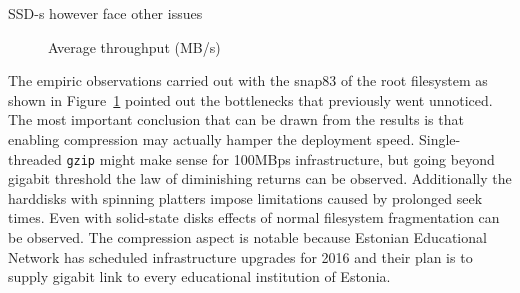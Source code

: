 \documentclass[a4paper,11pt]{kth-mag}
\begin{document}
SSD-s however face other issues

\begin{figure}
\caption{Average throughput (MB/s)}
\label{fig:average-throughput}
\end{figure}

The empiric observations carried out with
the snap83 of the root filesystem as shown in Figure~\ref{fig:average-throughput} pointed out
the bottlenecks that previously went unnoticed.
The most important conclusion that can be drawn from the
results is that enabling compression may actually hamper the
deployment speed.
Single-threaded \lstinline!gzip! might make sense for 100MBps infrastructure,
but going beyond gigabit threshold the law of diminishing returns can be observed.
Additionally the harddisks with spinning platters
impose limitations caused by prolonged seek times.
Even with solid-state disks effects of normal filesystem fragmentation
can be observed.
The compression aspect is notable because
Estonian Educational Network has scheduled infrastructure
upgrades for 2016 and their plan is to supply
gigabit link to every educational institution of Estonia.
\end{document}
